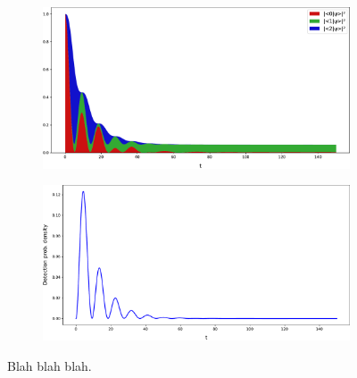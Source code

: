 \begin{figure}[h]
  \begin{subfigure}[b]{\textwidth}
    \centering
    \includegraphics[width=\textwidth]{img/3ldetect/loss3color_ext.pdf}
  \end{subfigure}
  \par\bigskip
  \par\bigskip
  \begin{subfigure}[b]{\textwidth}
    \centering
    \includegraphics[width=\textwidth]{img/3ldetect/loss_ext.pdf}
  \end{subfigure}
  \par\bigskip
  \par\bigskip
  \caption{
    Blah blah blah.
  }
\end{figure}


